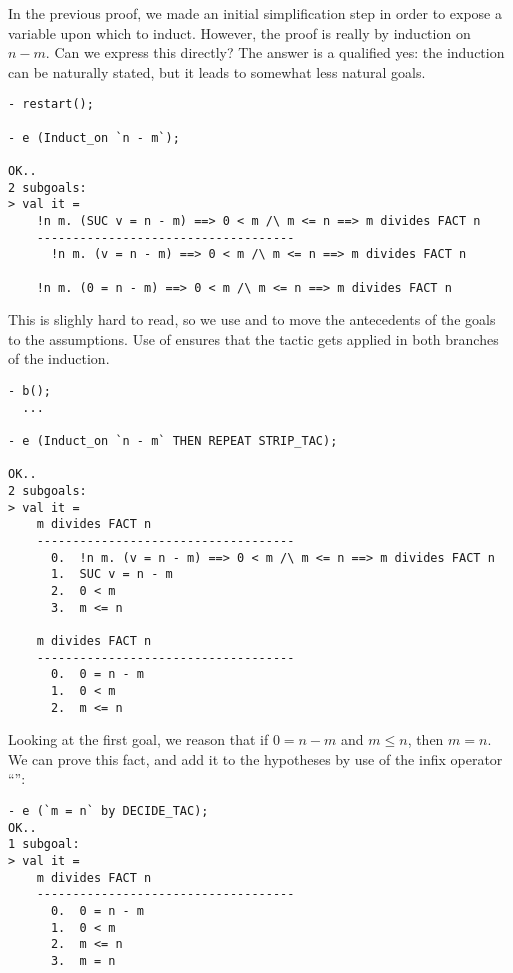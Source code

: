 In the previous proof, we made an initial simplification step in order
to expose a variable upon which to induct. However, the proof is
really by induction on $n - m$. Can we express this directly? The
answer is a qualified yes: the induction can be naturally stated, but
it leads to somewhat less natural goals.
\begin{session}\begin{verbatim}
- restart();

- e (Induct_on `n - m`);

OK..
2 subgoals:
> val it =
    !n m. (SUC v = n - m) ==> 0 < m /\ m <= n ==> m divides FACT n
    ------------------------------------
      !n m. (v = n - m) ==> 0 < m /\ m <= n ==> m divides FACT n

    !n m. (0 = n - m) ==> 0 < m /\ m <= n ==> m divides FACT n
\end{verbatim}\end{session}
    This is slighly hard to read, so we use  and
     to move the antecedents of the goals to the
    assumptions. Use of  ensures that the tactic gets applied
    in both branches of the induction.
\begin{session}\begin{verbatim}
- b();
  ...

- e (Induct_on `n - m` THEN REPEAT STRIP_TAC);

OK..
2 subgoals:
> val it =
    m divides FACT n
    ------------------------------------
      0.  !n m. (v = n - m) ==> 0 < m /\ m <= n ==> m divides FACT n
      1.  SUC v = n - m
      2.  0 < m
      3.  m <= n

    m divides FACT n
    ------------------------------------
      0.  0 = n - m
      1.  0 < m
      2.  m <= n
\end{verbatim}\end{session}
Looking at the first goal, we reason that if $0 = n - m$ and $m
\leq n$, then $m = n$. We can prove this fact, and add it to the
hypotheses by use of the infix operator ``'':
\begin{session}\begin{verbatim}
- e (`m = n` by DECIDE_TAC);
OK..
1 subgoal:
> val it =
    m divides FACT n
    ------------------------------------
      0.  0 = n - m
      1.  0 < m
      2.  m <= n
      3.  m = n
\end{verbatim}\end{session}

